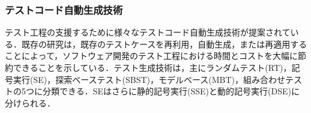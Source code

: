 \documentclass[12pt]{jarticle} %
\begin{document}

\newpage
\subsubsection{テストコード自動生成技術}
\label{sec:generation}
テスト工程の支援するために様々なテストコード自動生成技術が提案されている．既存の研究\cite{Machado2010}は，既存のテストケースを再利用，自動生成，または再適用することによって，ソフトウェア開発のテスト工程における時間とコストを大幅に節約できることを示している．テスト生成技術は，主にランダムテスト(RT)，記号実行(SE)，探索ベーステスト(SBST)，モデルベース(MBT)，組み合わせテストの5つに分類できる．SEはさらに静的記号実行(SSE)と動的記号実行(DSE)に分けられる．
\end{document}
